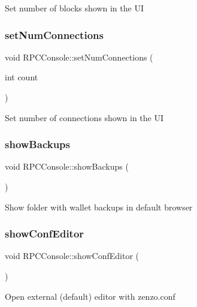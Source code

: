 Set number of blocks shown in the UI \mbox{\label{class_r_p_c_console_aa4546cb7812dd35704de8bf09a6ceb60}} 
\subsubsection{\texorpdfstring{setNumConnections}{setNumConnections}}
{\footnotesize\ttfamily void R\+P\+C\+Console\+::set\+Num\+Connections (\begin{DoxyParamCaption}\item[{int}]{count }\end{DoxyParamCaption})\hspace{0.3cm}{\ttfamily [slot]}}

Set number of connections shown in the UI \mbox{\label{class_r_p_c_console_a013ee20b746b6453375738e7b5e1cb4e}} 
\subsubsection{\texorpdfstring{showBackups}{showBackups}}
{\footnotesize\ttfamily void R\+P\+C\+Console\+::show\+Backups (\begin{DoxyParamCaption}{ }\end{DoxyParamCaption})\hspace{0.3cm}{\ttfamily [slot]}}

Show folder with wallet backups in default browser \mbox{\label{class_r_p_c_console_ab7e647de183fc0d139bac81ed0492667}} 
\subsubsection{\texorpdfstring{showConfEditor}{showConfEditor}}
{\footnotesize\ttfamily void R\+P\+C\+Console\+::show\+Conf\+Editor (\begin{DoxyParamCaption}{ }\end{DoxyParamCaption})\hspace{0.3cm}{\ttfamily [slot]}}

Open external (default) editor with zenzo.\+conf \mbox{\label{class_r_p_c_console_ae2ab094db61f2822f4fb49618a908798}} 
